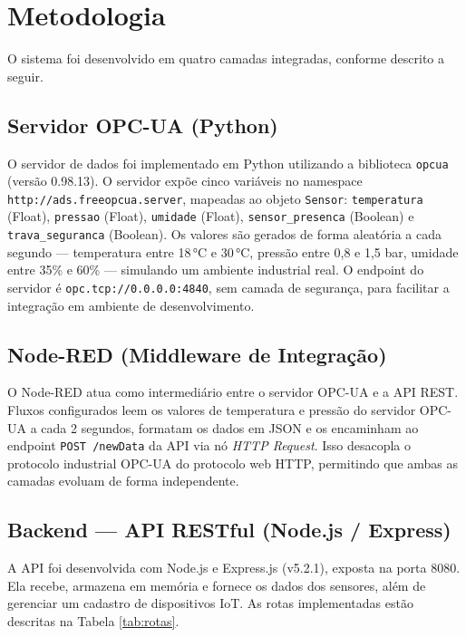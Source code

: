 \documentclass[12pt]{unisenaiclass}
\begin{document}
\section{Metodologia}

O sistema foi desenvolvido em quatro camadas integradas, conforme descrito a seguir.

\subsection{Servidor OPC-UA (Python)}

O servidor de dados foi implementado em Python utilizando a biblioteca \texttt{opcua}
(versão 0.98.13). O servidor expõe cinco variáveis no namespace
\texttt{http://ads.freeopcua.server}, mapeadas ao objeto \texttt{Sensor}:
\texttt{temperatura} (Float), \texttt{pressao} (Float), \texttt{umidade} (Float),
\texttt{sensor\_presenca} (Boolean) e \texttt{trava\_seguranca} (Boolean). Os valores são
gerados de forma aleatória a cada segundo — temperatura entre 18\,°C e 30\,°C, pressão
entre 0,8 e 1,5 bar, umidade entre 35\% e 60\% — simulando um ambiente industrial real.
O endpoint do servidor é \texttt{opc.tcp://0.0.0.0:4840}, sem camada de segurança, para
facilitar a integração em ambiente de desenvolvimento.

\subsection{Node-RED (Middleware de Integração)}

O Node-RED atua como intermediário entre o servidor OPC-UA e a API REST. Fluxos
configurados leem os valores de temperatura e pressão do servidor OPC-UA a cada 2 segundos,
formatam os dados em JSON e os encaminham ao endpoint \texttt{POST /newData} da API via
nó \textit{HTTP Request}. Isso desacopla o protocolo industrial OPC-UA do protocolo web
HTTP, permitindo que ambas as camadas evoluam de forma independente.

\subsection{Backend — API RESTful (Node.js / Express)}

A API foi desenvolvida com Node.js e Express.js (v5.2.1), exposta na porta 8080. Ela
recebe, armazena em memória e fornece os dados dos sensores, além de gerenciar um cadastro
de dispositivos IoT. As rotas implementadas estão descritas na Tabela \ref{tab:rotas}.
\end{document}
